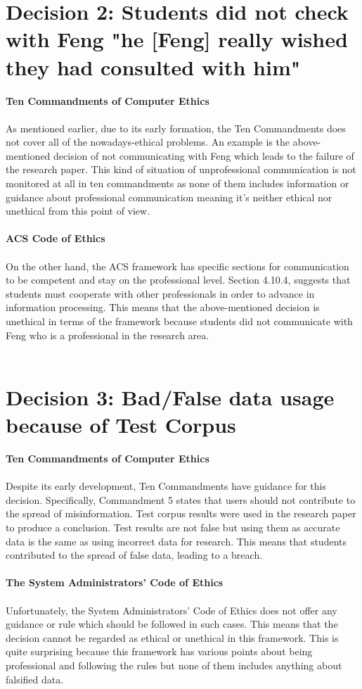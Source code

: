 \documentclass[a4paper]{report}
\begin{document}
\section{Decision 2: Students did not check with Feng "he [Feng] really wished they had consulted with him"\cite{casestudy}}
\textbf{Ten Commandments of Computer Ethics}\\\\
As mentioned earlier, due to its early formation, the Ten Commandments does not cover all of the nowadays-ethical problems. An example is the above-mentioned decision of not communicating with Feng which leads to the failure of the research paper. This kind of situation of unprofessional communication is not monitored at all in ten commandments as none of them includes information or guidance about professional communication meaning it’s neither ethical nor unethical from this point of view.\\\\
\textbf{ACS Code of Ethics\cite{ACS} }\\\\
On the other hand, the ACS framework has specific sections for communication to be competent and stay on the professional level. Section 4.10.4, suggests that students must cooperate with other professionals in order to advance in information processing\cite{ACS}. This means that the above-mentioned decision is unethical in terms of the framework because students did not communicate with Feng who is a professional in the research area.\\\\
\section{Decision 3: Bad/False data usage because of Test Corpus\cite{casestudy}}
\textbf{Ten Commandments of Computer Ethics}\\\\
Despite its early development, Ten Commandments have guidance for this decision. Specifically, Commandment 5\cite{tencommands} states that users should not contribute to the spread of misinformation. Test corpus results were used in the research paper to produce a conclusion. Test results are not false but using them as accurate data is the same as using incorrect data for research. This means that students contributed to the spread of false data, leading to a breach.\\\\
\textbf{The System Administrators' Code of Ethics\cite{SYS}}\\\\
Unfortunately, the System Administrators’ Code of Ethics does not offer any guidance or rule which should be followed in such cases. This means that the decision cannot be regarded as ethical or unethical in this framework. This is quite surprising because this framework has various points about being professional and following the rules but none of them includes anything about falsified data.


\end{document}
